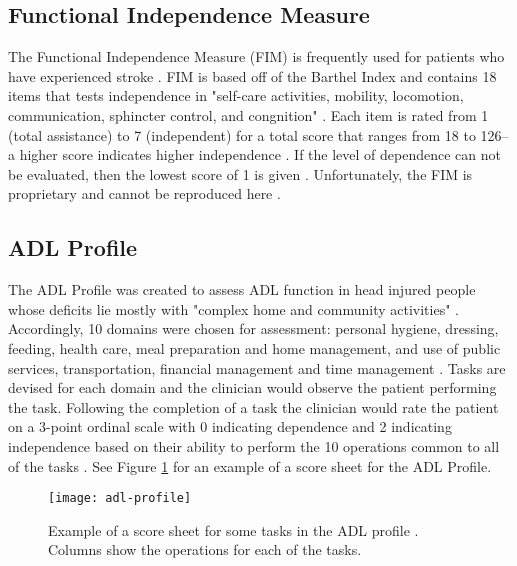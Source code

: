 \clearpage
\subsection{Functional Independence Measure}
The Functional Independence Measure (FIM) is frequently used for patients who have experienced stroke \cite{davidson_functional_2014}. FIM is based off of the Barthel Index and contains 18 items that tests independence in "self-care activities, mobility, locomotion, communication, sphincter control, and congnition" \cite{davidson_functional_2014}. Each item is rated from 1 (total assistance) to 7 (independent) for a total score that ranges from 18 to 126--a higher score indicates higher independence \cite{davidson_functional_2014}. If the level of dependence can not be evaluated, then the lowest score of 1 is given \cite{davidson_functional_2014}. Unfortunately, the FIM is proprietary and cannot be reproduced here \cite{noauthor_fimtm_nodate}. 

\clearpage
\subsection{ADL Profile}
The ADL Profile was created to assess ADL function in head injured people whose deficits lie mostly with "complex home and community activities" \cite{dutil_development_1990}. Accordingly, 10 domains were chosen for assessment: personal hygiene, dressing, feeding, health care, meal preparation and home management, and use of public services, transportation, financial management and time management \cite{dutil_development_1990}. Tasks are devised for each domain and the clinician would observe the patient performing the task. Following the completion of a task the clinician would rate the patient on a 3-point ordinal scale with 0 indicating dependence and 2 indicating independence based on their ability to perform the 10 operations common to all of the tasks \cite{dutil_development_1990}. See Figure \ref{fig:adl-profile} for an example of a score sheet for the ADL Profile.

\begin{figure}[ht]
    \centering
    \texttt{[image: adl-profile]}
    \caption{Example of a score sheet for some tasks in the ADL profile \cite{dutil_development_1990}. Columns show the operations for each of the tasks.}
    \label{fig:adl-profile}
\end{figure}


